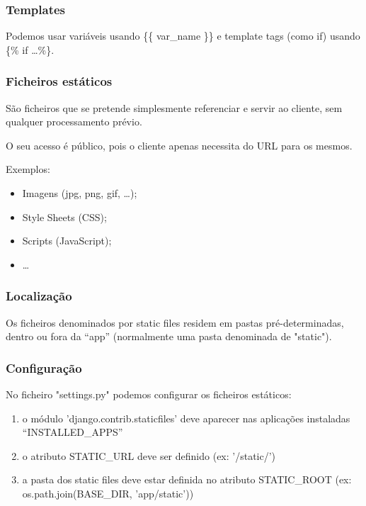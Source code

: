 \documentclass{article}
\begin{document}
\subsubsection{Templates}

\begin{flushleft}
  Podemos usar variáveis usando \{\{ var\_name \}\} e template tags (como if)
  usando \{\% if \dots \%\}.
\end{flushleft}

\pagebreak

\subsubsection{Ficheiros estáticos}

\begin{flushleft}
  São ficheiros que se pretende simplesmente referenciar e servir ao cliente,
  sem qualquer processamento prévio.

  O seu acesso é público, pois o cliente apenas necessita do URL para os mesmos.

  Exemplos:
  \begin{itemize}
    \item Imagens (jpg, png, gif, \dots);
    \item Style Sheets (CSS);
    \item Scripts (JavaScript);
    \item \dots
  \end{itemize}
\end{flushleft}

\subsubsection*{Localização}

\begin{flushleft}
Os ficheiros denominados por static files
residem em pastas pré-determinadas, dentro
ou fora da “app” (normalmente uma pasta denominada de "static").
\end{flushleft}

\subsubsection*{Configuração}

\begin{flushleft}
  No ficheiro "settings.py" podemos configurar os ficheiros estáticos:
  \begin{enumerate}
    \item o módulo 'django.contrib.staticfiles' deve aparecer
    nas aplicações instaladas “INSTALLED\_APPS”
    \item o atributo STATIC\_URL deve ser definido (ex: '/static/')
    \item a pasta dos static files deve estar definida no atributo STATIC\_ROOT
    (ex: os.path.join(BASE\_DIR, 'app/static'))
  \end{enumerate}
\end{flushleft}
\end{document}
